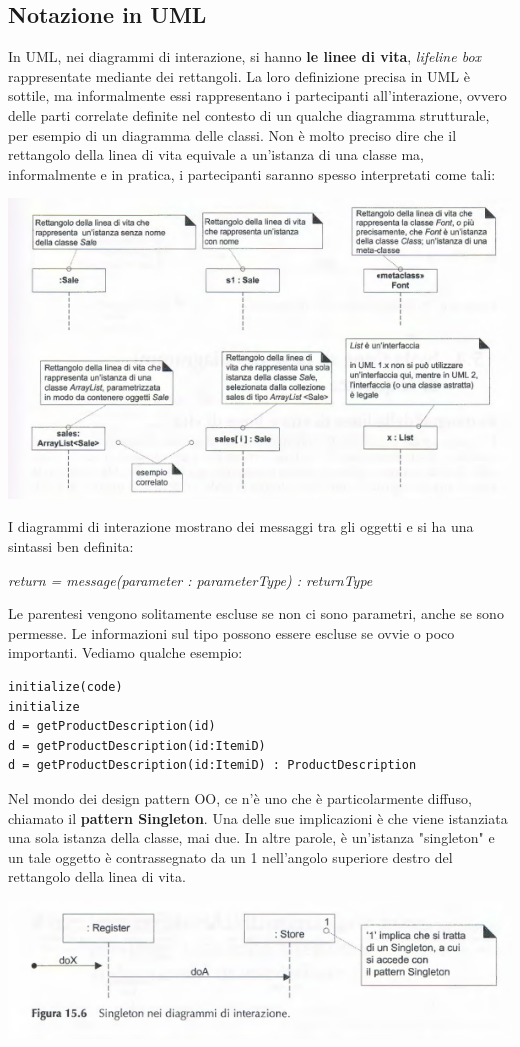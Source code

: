 \documentclass[a4paper,12pt, oneside]{book}
\begin{document}
\subsection{Notazione in UML}
In UML, nei diagrammi di interazione, si hanno \textbf{le linee di vita}, \textit{lifeline box} rappresentate mediante dei rettangoli. La loro definizione precisa in UML è sottile, ma informalmente essi rappresentano i partecipanti all'interazione, ovvero delle parti correlate definite nel contesto di un qualche diagramma strutturale, per esempio di un diagramma delle classi. Non è molto preciso dire che il rettangolo della linea di vita equivale a un'istanza di una classe ma, informalmente e in pratica, i partecipanti saranno spesso interpretati come tali:
\begin{center}
	\includegraphics[scale=0.7]{img/lfd.png}
\end{center}
I diagrammi di interazione mostrano dei messaggi tra gli oggetti e si ha una sintassi ben definita:
\begin{center}
	\textit{return = message(parameter : parameterType) : returnType}
\end{center}
Le parentesi vengono solitamente escluse se non ci sono parametri, anche se sono permesse. Le informazioni sul tipo possono essere escluse se ovvie o poco importanti. Vediamo qualche esempio:
\begin{verbatim}
initialize(code)
initialize
d = getProductDescription(id)
d = getProductDescription(id:ItemiD)
d = getProductDescription(id:ItemiD) : ProductDescription
\end{verbatim}
\newpage
Nel mondo dei design pattern OO, ce n'è uno che è particolarmente diffuso, chiamato il \textbf{pattern Singleton}. Una delle sue implicazioni è che viene istanziata una sola istanza della classe, mai due. In altre parole, è
un'istanza "singleton" e un tale oggetto è contrassegnato da un 1 nell'angolo superiore destro del rettangolo della linea di vita.
\begin{center}
	\includegraphics[scale=0.7]{img/sing.png}
\end{center}
\end{document}
